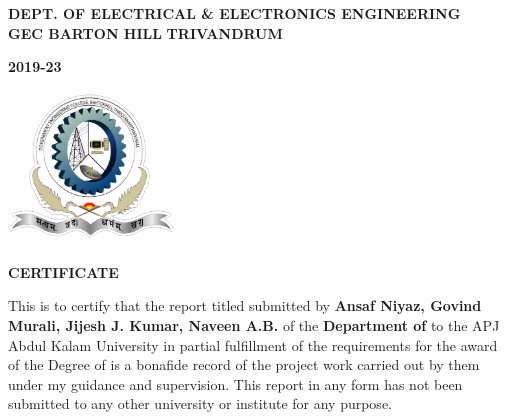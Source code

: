 \thispagestyle{plain}
\newpage
\begin{center}  
  
  \textbf{DEPT. OF ELECTRICAL \& ELECTRONICS  ENGINEERING}
  \\  
  \textbf{GEC BARTON HILL}  
  \textbf{TRIVANDRUM}
  
  \textbf{2019-23} 
\end{center}

\begin{center}
  \includegraphics[width=44mm]{logo.png}  
\end{center}
\begin{center}
  \textbf{CERTIFICATE}
\end{center}

\noindent 

This is to certify that the report titled {\bf \ReportTitle}submitted by {\bf Ansaf Niyaz, Govind Murali, Jijesh J. Kumar, Naveen A.B.} of the {\bf Department of \Department} to the APJ Abdul Kalam
University in partial fulfillment of the requirements for the award of the Degree of \emph{\Degree} is a bonafide record of the project work
carried out by them under my guidance and supervision. This report in any form has not been
submitted
to
any
other
university
or
institute
for
any
purpose.

